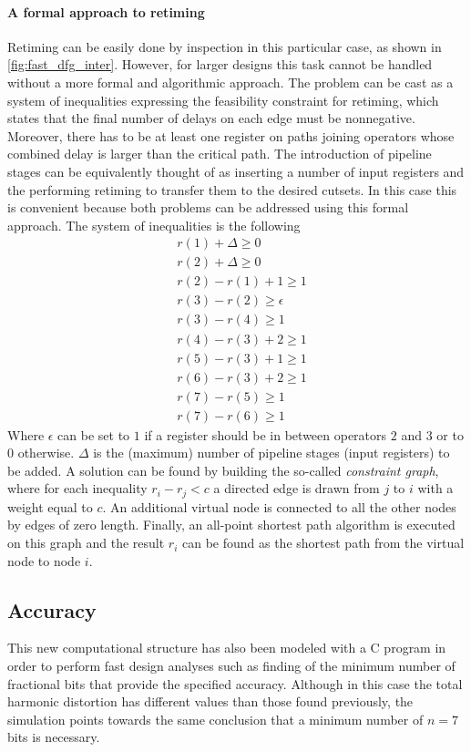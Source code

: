 \paragraph{A formal approach to retiming} Retiming can be easily done by inspection in this particular case, as shown in \autoref{fig:fast_dfg_inter}. However, for larger designs this task cannot be handled without a more formal and algorithmic approach. The problem can be cast as a system of inequalities expressing the feasibility constraint for retiming, which states that the final number of delays on each edge must be nonnegative. Moreover, there has to be at least one register on paths joining operators whose combined delay is larger than the critical path. The introduction of pipeline stages can be equivalently thought of as inserting a number of input registers and the performing retiming to transfer them to the desired cutsets. In this case this is convenient because both problems can be addressed using this formal approach. The system of inequalities is the following
\begin{align*}
&r(1) + \Delta \geq 0\\
&r(2)+\Delta \geq 0\\
&r(2)-r(1)+1\geq 1\\
&r(3)-r(2)\geq \epsilon\\
&r(3)-r(4) \geq 1\\
&r(4)-r(3)+2 \geq 1\\
&r(5)-r(3)+1\geq 1\\
&r(6)-r(3)+2\geq 1\\
&r(7)-r(5)\geq 1\\
&r(7)-r(6)\geq 1
\end{align*}
Where $\epsilon$ can be set to $1$ if a register should be in between operators $2$ and $3$ or to $0$ otherwise. $\Delta$ is the (maximum) number of pipeline stages (input registers) to be added.
A solution can be found by building the so-called \textit{constraint graph}, where for each inequality $r_i-r_j < c$  a directed edge is drawn from $j$ to $i$ with a weight equal to $c$. An additional virtual node is connected to all the other nodes by edges of zero length. Finally, an all-point shortest path algorithm is executed on this graph and the result $r_i$ can be found as the shortest path from the virtual node to node $i$.

\subsection{Accuracy}
This new computational structure has also been modeled with a C program in order to perform fast design analyses such as finding of the minimum number of fractional bits that provide the specified accuracy. Although in this case the total harmonic distortion has different values than those found previously, the simulation points towards the same conclusion that a minimum number of $n=7$ bits is necessary.
